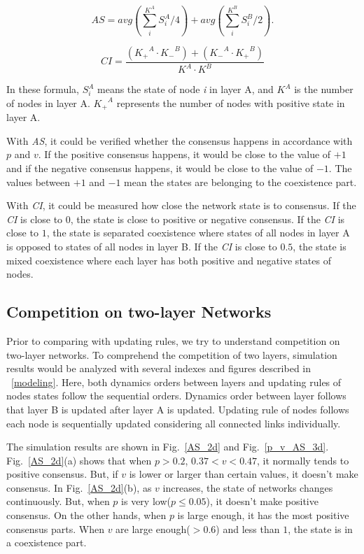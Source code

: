 \documentclass[review]{elsarticle}
\begin{document}
\begin{equation}
AS = avg\left( {\sum\limits_i^{{K^A}} {S_i^A/4} } \right) + avg\left( {\sum\limits_i^{{K^B}} {S_i^B/2} } \right).
\end{equation}

\begin{equation}
CI = \frac{{({K_ + }^A \cdot {K_ - }^B) + ({K_ - }^A \cdot {K_ + }^B)}}{{{K^A} \cdot {K^B}}}
\end{equation}

In these formula, $S_i^A$ means the state of node \textit{i} in layer A, and $K^A$ is the number of nodes in layer A. ${K_ + }^A$ represents the number of nodes with positive state in layer A.   

With \textit{AS}, it could be verified whether the consensus happens in accordance with $p$ and $v$.  If the positive consensus happens, it would be close to the value of $+1$ and if the negative consensus happens, it would be close to the value of $-1$. The values between $+1$ and $-1$ mean the states are belonging to the coexistence part.

With \textit{CI}, it could be measured how close the network state is to consensus. If the \textit{CI} is close to $0$, the state is close to positive or negative consensus. If the \textit{CI} is close to $1$, the state is separated coexistence where states of all nodes in layer A is opposed to states of all nodes in layer B. If the \textit{CI} is close to $0.5$, the state is mixed coexistence where each layer has both positive and negative states of nodes.    

\subsection{Competition on two-layer Networks}
\label{competition on two-layer networks}
Prior to comparing with updating rules, we try to understand competition on two-layer networks. To comprehend the competition of two layers, simulation results would be analyzed with several indexes and figures described in ~\ref{modeling}. Here, both dynamics orders between layers and updating rules of nodes states follow the sequential orders. Dynamics order between layer follows that layer B is updated after layer A is updated. Updating rule of nodes follows each node is sequentially updated considering all connected links individually. 
 
The simulation results are shown in Fig.~\ref{AS_2d} and Fig.~\ref{p_v_AS_3d}. Fig.~\ref{AS_2d}(a) shows that when $p > 0.2$, $0.37 < v < 0.47$, it normally tends to positive consensus. But, if $v$ is lower or larger than certain values, it doesn't make consensus.
In Fig.~\ref{AS_2d}(b), as $v$ increases, the state of networks changes continuously. But, when $p$ is very low($p \le 0.05$), it doesn't make positive consensus. On the other hands, when $p$ is large enough, it has the most positive consensus parts. When $v$ are large enough($>0.6$) and less than $1$, the state is in a coexistence part.
\end{document}
